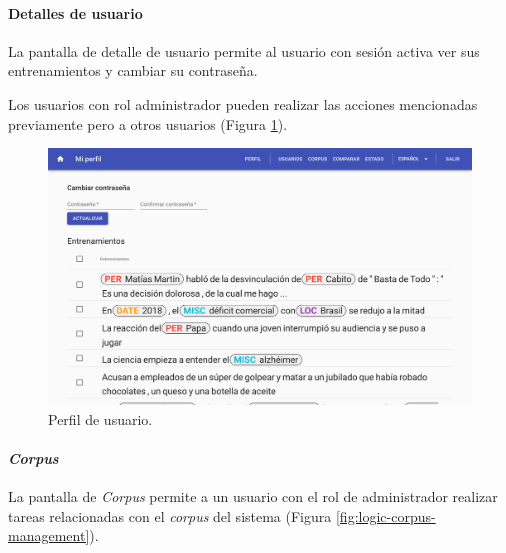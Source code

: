 \documentclass[12pt,a4paper,]{scrartcl}
\let\oldparagraph\paragraph
\renewcommand{\paragraph}[1]{\oldparagraph{#1}\mbox{}}
\begin{document}
\hypertarget{detalles-de-usuario}{%
\paragraph{Detalles de usuario}\label{detalles-de-usuario}}

La pantalla de detalle de usuario permite al usuario con sesión activa ver sus entrenamientos y cambiar su contraseña.

Los usuarios con rol administrador pueden realizar las acciones mencionadas previamente pero a otros usuarios (Figura \ref{fig:logic-user-profile}).

\begin{figure}[H]

{\centering \includegraphics{assets/logic/user-profile.pdf} 

}

\caption{Perfil de usuario.}\label{fig:logic-user-profile}
\end{figure}

\hypertarget{corpus}{%
\paragraph{\texorpdfstring{\emph{Corpus}}{Corpus}}\label{corpus}}

La pantalla de \emph{Corpus} permite a un usuario con el rol de administrador realizar tareas relacionadas con el \emph{corpus} del sistema (Figura \ref{fig:logic-corpus-management}).
\end{document}
